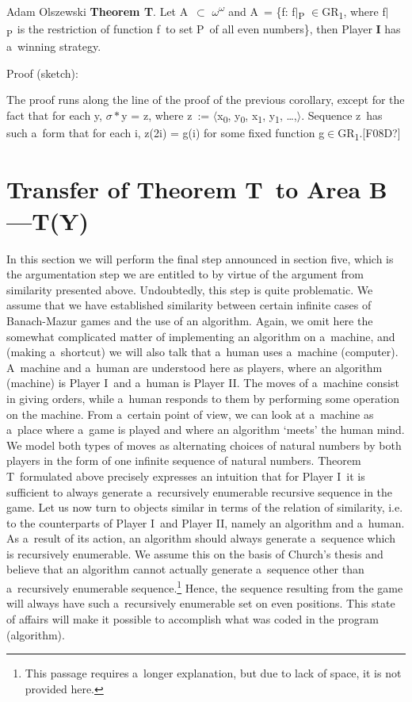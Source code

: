 \begin{artengenv}{Adam Olszewski}
\textbf{Theorem T}. Let A~${\subset}$ ${\omega}$\textsuperscript{${\omega}$} and A~= \{f: f${\mid}$\textsubscript{P} ${\in}$GR\textsubscript{1}, where f${\mid}$\textsubscript{P~}is the restriction of function f~to set P~of all even numbers\}, then Player \textbf{I} has a~winning strategy.

Proof (sketch):

The proof runs along the line of the proof of the previous corollary, except for the fact that for each y, ${\sigma}*$y = z, where z~:= ${\langle}$x\textsubscript{0}, y\textsubscript{0}, x\textsubscript{1}, y\textsubscript{1}, \ldots,${\rangle}$. Sequence z~has such a~form that for each i, z(2i) = g(i) for some fixed function g${\in}$GR\textsubscript{1}.[F08D?]

\section{Transfer of Theorem T~to Area B—T(Y)}
In this section we will perform the final step announced in section five, which is the argumentation step we are entitled to by virtue of the argument from similarity presented above. Undoubtedly, this step is quite problematic. We assume that we have established similarity between certain infinite cases of Banach-Mazur games and the use of an algorithm. Again, we omit here the somewhat complicated matter of implementing an algorithm on a~machine, and (making a~shortcut) we will also talk that a~human uses a~machine (computer). A~machine and a~human are understood here as players, where an algorithm (machine) is Player I~and a~human is Player II. The moves of a~machine consist in giving orders, while a~human responds to them by performing some operation on the machine. From a~certain point of view, we can look at a~machine as a~place where a~game is played and where an algorithm ‘meets' the human mind. We model both types of moves as alternating choices of natural numbers by both players in the form of one infinite sequence of natural numbers. Theorem T~formulated above precisely expresses an intuition that for Player I~it is sufficient to always generate a~recursively enumerable recursive sequence in the game. Let us now turn to objects similar in terms of the relation of similarity, i.e. to the counterparts of Player I~and Player II, namely an algorithm and a~human. As a~result of its action, an algorithm should always generate a~sequence which is recursively enumerable. We assume this on the basis of Church's thesis and believe that an algorithm cannot actually generate a~sequence other than a~recursively enumerable sequence.\footnote{This passage requires a~longer explanation, but due to lack of space, it is not provided here.} Hence, the sequence resulting from the game will always have such a~recursively enumerable set on even positions. This state of affairs will make it possible to accomplish what was coded in the program (algorithm).


\end{artengenv}
